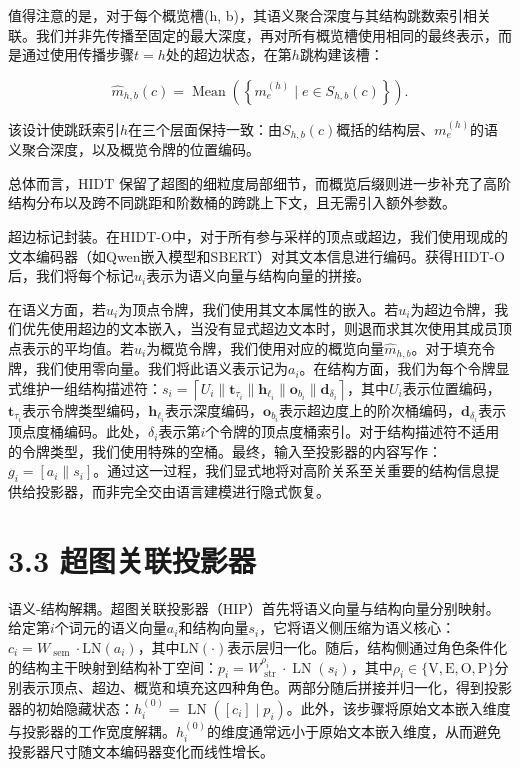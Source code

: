 \documentclass[10pt]{article}
\begin{document}
值得注意的是，对于每个概览槽(h, b)，其语义聚合深度与其结构跳数索引相关联。我们并非先传播至固定的最大深度，再对所有概览槽使用相同的最终表示，而是通过使用传播步骤\(t = h\)处的超边状态，在第\(h\)跳构建该槽：

\[
{\widehat{m}}_{h,b}\left( c\right)  = \operatorname{Mean}\left( \left\{  {{m}_{e}^{\left( h\right) } \mid  e \in  {S}_{h,b}\left( c\right) }\right\}  \right) . \tag{4}
\]

该设计使跳跃索引\(h\)在三个层面保持一致：由\({S}_{h,b}\left( c\right)\)概括的结构层、\({m}_{e}^{\left( h\right) }\)的语义聚合深度，以及概览令牌的位置编码。

总体而言，HIDT 保留了超图的细粒度局部细节，而概览后缀则进一步补充了高阶结构分布以及跨不同跳距和阶数桶的跨跳上下文，且无需引入额外参数。

超边标记封装。在HIDT-O中，对于所有参与采样的顶点或超边，我们使用现成的文本编码器（如Qwen嵌入模型和SBERT）对其文本信息进行编码。获得HIDT-O后，我们将每个标记\({u}_{i}\)表示为语义向量与结构向量的拼接。

在语义方面，若\({u}_{i}\)为顶点令牌，我们使用其文本属性的嵌入。若\({u}_{i}\)为超边令牌，我们优先使用超边的文本嵌入，当没有显式超边文本时，则退而求其次使用其成员顶点表示的平均值。若\({u}_{i}\)为概览令牌，我们使用对应的概览向量\({\widehat{m}}_{h,b}\)。对于填充令牌，我们使用零向量。我们将此语义表示记为\({a}_{i}\)。在结构方面，我们为每个令牌显式维护一组结构描述符：\({s}_{i} = \left\lceil{{U}_{i}\parallel{\mathbf{t}}_{{\tau }_{i}}\parallel{\mathbf{h}}_{{\ell }_{i}}\parallel{\mathbf{o}}_{{b}_{i}}\parallel{\mathbf{d}}_{{\delta }_{i}}}\right\rceil\)，其中\({U}_{i}\)表示位置编码，\({\mathbf{t}}_{{\tau }_{i}}\)表示令牌类型编码，\({\mathbf{h}}_{{\ell }_{i}}\)表示深度编码，\({\mathbf{o}}_{{b}_{i}}\)表示超边度上的阶次桶编码，\({\mathbf{d}}_{{\delta }_{i}}\)表示顶点度桶编码。此处，\({\delta }_{i}\)表示第\(i\)个令牌的顶点度桶索引。对于结构描述符不适用的令牌类型，我们使用特殊的空桶。最终，输入至投影器的内容写作：\({g}_{i} = \left\lbrack{{a}_{i}\parallel{s}_{i}}\right\rbrack\)。通过这一过程，我们显式地将对高阶关系至关重要的结构信息提供给投影器，而非完全交由语言建模进行隐式恢复。

\section*{3.3 超图关联投影器}

语义-结构解耦。超图关联投影器（HIP）首先将语义向量与结构向量分别映射。给定第\(i\)个词元的语义向量\({a}_{i}\)和结构向量\({s}_{i}\)，它将语义侧压缩为语义核心：\({c}_{i} = {W}_{\text{ sem }} \cdot  \mathrm{{LN}}\left( {a}_{i}\right)\)，其中\(\mathrm{{LN}}\left( \cdot \right)\)表示层归一化。随后，结构侧通过角色条件化的结构主干映射到结构补丁空间：\({p}_{i} = {W}_{\text{ str }}^{{\rho }_{i}} \cdot  \operatorname{LN}\left( {s}_{i}\right)\)，其中\({\rho }_{i} \in  \{ \mathrm{V},\mathrm{E},\mathrm{O},\mathrm{P}\}\)分别表示顶点、超边、概览和填充这四种角色。两部分随后拼接并归一化，得到投影器的初始隐藏状态：\({h}_{i}^{\left( 0\right) } = \operatorname{LN}\left( {\left\lbrack{c}_{i}\right\rbrack   \mid{p}_{i}}\right)\)。此外，该步骤将原始文本嵌入维度与投影器的工作宽度解耦。\({h}_{i}^{\left( 0\right) }\)的维度通常远小于原始文本嵌入维度，从而避免投影器尺寸随文本编码器变化而线性增长。
\end{document}
